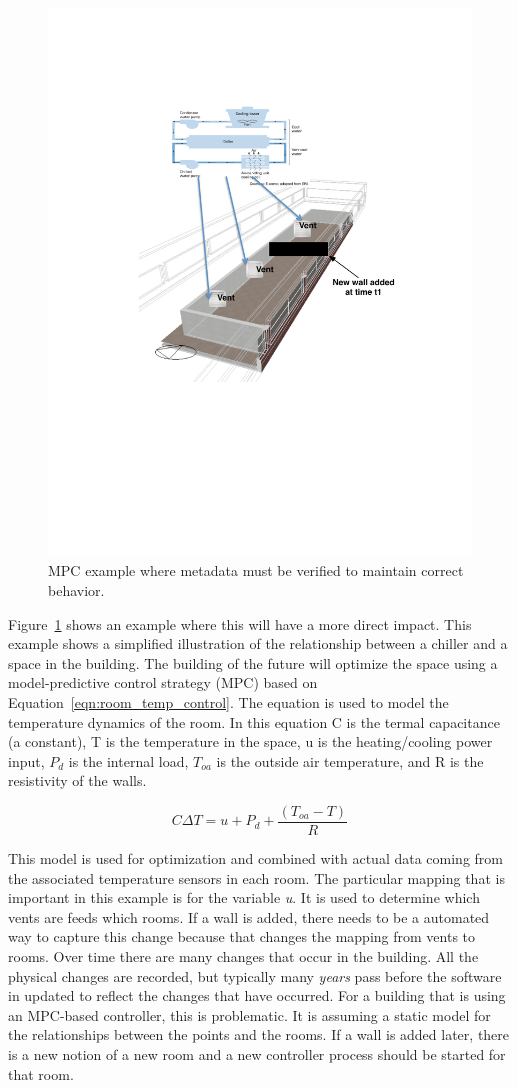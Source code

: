 \begin{figure}[h!] %
\centering
\includegraphics[width=0.5\columnwidth]{figs/mpc_example}
\caption{MPC example where metadata must be verified to maintain correct behavior.}
\label{fig:mpc_example}
\end{figure}

Figure~\ref{fig:mpc_example} shows an example where this will have a more direct impact.  This example shows a simplified illustration
of the relationship between a chiller and a space in the building.  The building of the future will optimize the space using a 
model-predictive control strategy (MPC) based on Equation~\ref{eqn:room_temp_control}.  The equation is used to model the temperature
dynamics of the room.  In this equation C is the termal capacitance (a constant), T is the temperature in the space, u is the heating/cooling
power input, $P_{d}$ is the internal load, $T_{oa}$ is the outside air temperature, and R is the resistivity of the walls.


\begin{equation}
\label{eqn:room_temp_control}
C \Delta T = u + P_d + \frac{(T_{oa} - T)}{R}
\end{equation}

This model is used for optimization and combined with actual data coming from the associated temperature sensors in each room.
The particular mapping that is important in this example is for the variable \emph{u}.  It is used to determine
which vents are feeds which rooms.  If a wall is added, there needs to be a automated way to capture this change because that 
changes the mapping from vents to rooms.
Over time there are many changes that occur in the building.
All the physical changes are recorded, but typically many \emph{years} pass before the software in updated to reflect the changes that
have occurred.  For a building that is using an MPC-based controller, this is problematic.  It is assuming a static model for the relationships
between the points and the rooms.  If a wall is added later, there is a new notion of a new room and a new controller process should be 
started for that room.

